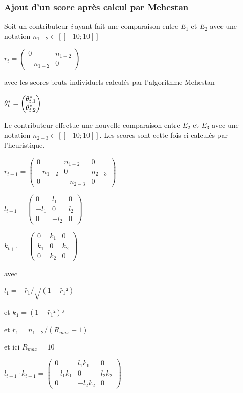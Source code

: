 
\subsubsection{Ajout d'un score après calcul par Mehestan}


Soit un contributeur \textit{i} ayant fait une comparaison entre $E_{1}$ et $E_{2}$ avec une notation $n_{1-2} \in [\![-10;10]\!]$


$r_{t}= \begin{pmatrix}
0 & n_{1-2} \\
-n_{1-2} & 0 
\end{pmatrix}$

avec les scores bruts individuels calculés par l'algorithme Mehestan

$\theta^*_{t}= \begin{pmatrix}
\theta^*_{t,1} \\
\theta^*_{t,2} 
\end{pmatrix}$

Le contributeur effectue une nouvelle comparaison entre $E_{2}$ et $E_{3}$ avec une notation $n_{2-3} \in [\![-10;10]\!]$. Les scores sont cette fois-ci calculés par l'heuristique.

$r_{t+1}= \begin{pmatrix}
0 & n_{1-2} & 0\\
-n_{1-2} & 0 & n_{2-3}\\
0 & -n_{2-3} & 0
\end{pmatrix}$

$l_{t+1}= \begin{pmatrix}
0 & l_1 & 0\\
-l_1 & 0 & l_2\\
0 & -l_2 & 0
\end{pmatrix}
$

$k_{t+1}= \begin{pmatrix}
0 & k_1 & 0\\
k_1 & 0 & k_2\\
0 & k_2 & 0
\end{pmatrix}
$

avec 

$l_1= -\tilde{r_1}/\sqrt{(1-\tilde{r_1}²)}$

et $k_1= (1-\tilde{r_1}²)³ $

et $\tilde{r_1} = n_{1-2}/(R_{max}+1)$

et ici $R_{max}=10$

$l_{t+1} \cdot k_{t+1}= \begin{pmatrix}
0 & l_1 k_1 & 0\\
-l_1 k_1 & 0 & l_2 k_2\\
0 & -l_2 k_2 & 0
\end{pmatrix}
$

